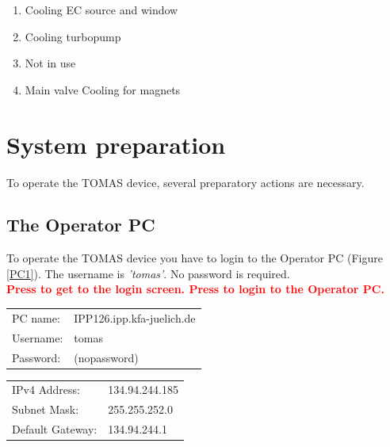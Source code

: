 \documentclass[fleqn,a4paper,20pt]{article}
\begin{document}
\begin{enumerate}
	\item Cooling EC source and window
	\item Cooling turbopump
	\item Not in use
	\item Main valve Cooling for magnets
\end{enumerate}


\newpage
\section{System preparation}%

\begin{minipage}{.68\textwidth}
To operate the TOMAS device, several preparatory actions are necessary.

\subsection{The Operator PC} To operate the TOMAS device you have to login to the Operator PC (Figure \ref{PC1}). The username is \textit{'tomas'}. No password is required.\\

\textcolor{red}{\textbf{Press \keys{\ctrl + \Alt + \del} to get to the login screen. Press \keys{\enter} to login to the Operator PC. }}\\

\begin{minipage}{.5\textwidth}
\begin{tabular}{ll}
	PC name: &IPP126.ipp.kfa-juelich.de\\
	Username: &tomas\\
	Password: &(nopassword)
\end{tabular}
\end{minipage}
\begin{minipage}{.5\textwidth}
	\begin{tabular}{ll}
		IPv4 Address: &134.94.244.185\\
		Subnet Mask:& 255.255.252.0\\
		Default Gateway:& 134.94.244.1
	\end{tabular}
\end{minipage}
\vspace{0.6cm}

\begin{minipage}{.76\textwidth}

\end{minipage}
\end{minipage}
\end{document}
